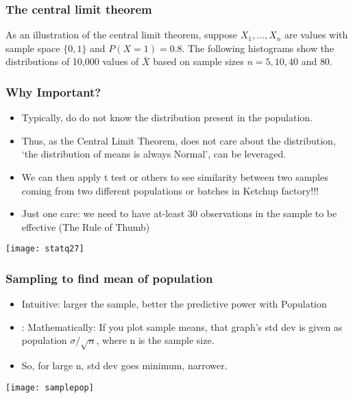 \begin{frame}
\frametitle{The central limit theorem}

As an illustration of the central limit theorem, suppose $X_1, \ldots,
X_n$ are values with sample space $\{0,1\}$ and $P(X=1) = 0.8$.  The
following histograms show the distributions of 10,000 values of
$\bar{X}$ based on sample sizes $n=5,10,40$ and $80$.


\end{frame}

\begin{frame}[fragile]\frametitle{Why Important?}
\begin{itemize}
\item Typically, do do not know the distribution present in the population.
\item Thus, as the Central Limit Theorem, does not care about the distribution, `the distribution of means is always Normal', can be leveraged.
\item We can then apply t test or others to see similarity between two samples coming from two different populations or batches in Ketchup factory!!!
\item Just one care: we need to have at-least 30 observations in the sample to be effective (The Rule of Thumb)
\end{itemize}
\begin{center}
\texttt{[image: statq27]}
\end{center}
\end{frame}


\begin{frame}[fragile]\frametitle{Sampling to find mean of population}
\begin{itemize}
\item Intuitive: larger the sample, better the predictive power with Population
\item: Mathematically: If you plot sample means, that graph's std dev is given as population $\sigma/\sqrt{n}$, where n is the sample size.
\item So, for large n, std dev goes minimum, narrower.
\end{itemize}
\begin{center}
\texttt{[image: samplepop]}
\end{center}
\end{frame}

